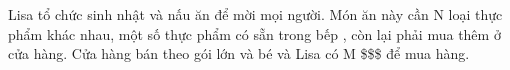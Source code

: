 Lisa tổ chức sinh nhật và nấu ăn để mời mọi người. Món ăn này cần N loại thực phẩm khác nhau, một số thực phẩm có sẵn trong bếp , còn lại phải mua thêm ở cửa hàng. Cửa hàng bán theo gói lớn và bé và Lisa có M \$\$\$ để mua hàng.